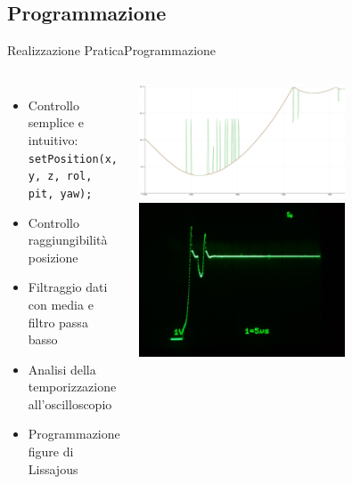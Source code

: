 \documentclass[10pt,aspectratio=169
	]{beamer}
\begin{document}
	\subsection{Programmazione}
	\begin{frame}{Realizzazione Pratica}{Programmazione}
	\begin{columns}
	\begin{itemize}
	
		\item Controllo semplice e intuitivo:\\ 
		\small \texttt{setPosition(x, y, z, rol, pit, yaw);}
		\item Controllo raggiungibilità posizione
		
		\item Filtraggio dati con media e filtro passa basso
		\item Analisi della temporizzazione all'oscilloscopio
		\item Programmazione figure di Lissajous
	\end{itemize}
	\centering \includegraphics[width=0.65\textwidth]{./images/filtraggio2.png}\\
	\vspace{0.3cm}
	\centering \includegraphics[width=0.65\textwidth]{./images/osc2.jpg}
	\end{columns}
	\end{frame}
	
\end{document}
